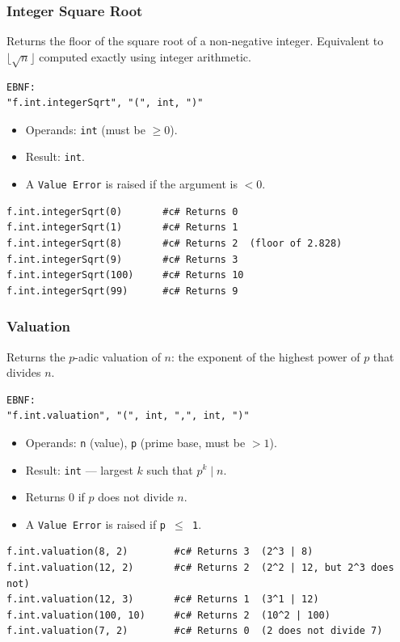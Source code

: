 \subsubsection{Integer Square Root}
Returns the floor of the square root of a non-negative integer. Equivalent to $\lfloor\sqrt{n}\rfloor$ computed exactly using integer arithmetic.
\begin{verbatim}
EBNF:
"f.int.integerSqrt", "(", int, ")"
\end{verbatim}
\begin{itemize}
\item Operands: \texttt{int} (must be $\geq 0$).
\item Result: \texttt{int}.
\item A \texttt{Value Error} is raised if the argument is $< 0$.
\end{itemize}
\begin{verbatim}
f.int.integerSqrt(0)       #c# Returns 0
f.int.integerSqrt(1)       #c# Returns 1
f.int.integerSqrt(8)       #c# Returns 2  (floor of 2.828)
f.int.integerSqrt(9)       #c# Returns 3
f.int.integerSqrt(100)     #c# Returns 10
f.int.integerSqrt(99)      #c# Returns 9
\end{verbatim}

\subsubsection{Valuation}
Returns the $p$-adic valuation of $n$: the exponent of the highest power of $p$ that divides $n$.
\begin{verbatim}
EBNF:
"f.int.valuation", "(", int, ",", int, ")"
\end{verbatim}
\begin{itemize}
\item Operands: \texttt{n} (value), \texttt{p} (prime base, must be $> 1$).
\item Result: \texttt{int} --- largest $k$ such that $p^k \mid n$.
\item Returns 0 if $p$ does not divide $n$.
\item A \texttt{Value Error} is raised if \texttt{p $\leq$ 1}.
\end{itemize}
\begin{verbatim}
f.int.valuation(8, 2)        #c# Returns 3  (2^3 | 8)
f.int.valuation(12, 2)       #c# Returns 2  (2^2 | 12, but 2^3 does not)
f.int.valuation(12, 3)       #c# Returns 1  (3^1 | 12)
f.int.valuation(100, 10)     #c# Returns 2  (10^2 | 100)
f.int.valuation(7, 2)        #c# Returns 0  (2 does not divide 7)
\end{verbatim}

